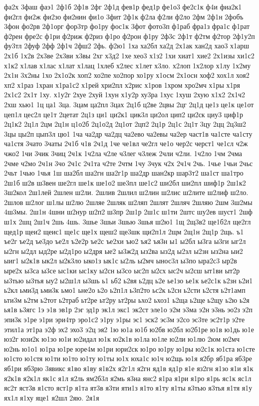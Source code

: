 фа2х
3фаш
фаэ1
2ф1б
2ф1в
2фг
2ф1д
фев1р
фед1р
фе1о3
фе2с1к
ф4и
фиа2к1
фи2гл
фи2ж
фи2зо
фи2нин
фи1о
3фит
2ф1к
ф2ла
ф2ли
ф2ло
2фм
2ф1н
2фобъ
3фон
фо2рв
2ф1орг
фор3тр
фо1ру
фос1к
3фот
фото3п
ф1раб
фра1з
фра1с
ф1рат
ф2рен
фре2с
ф1ри
ф2риж
ф2риз
ф1ро
ф2рон
ф1ру
2ф3с
2ф1т
ф2тм
ф2тор
2ф1у2п
фу3тл
2фуф
2фф
2ф1ч
2фш2
2фь.
ф2ю1
1ха
ха2бл
ха2д
2х1ак
хан2д
хао3
х1арш
2х1б
1х2в
2х3ве
2х3ви
х3вы
2хг
х3д2
1хе
хео3
х1з2
1хи
хиат1
хие2
2х1изы
хи1с2
х1к2
х1лав
х1лас
х1лат
х1лац
1хлеб
х2лес
х1лет
х3ло.
х2лоп
1х2лор
х1лу
1х2му
2х1н
3х2ны
1хо
2х1о2к
хоп2
хо2пе
хо2пор
хо1ру
х1осм
2х1осн
хоф2
хох1л
хоя2
хп2
х1раз
1хран
х1ра1с2
х1рей
хри2пл
х2рис
х1ров
1хром
хро2мч
х1ры
х1ря
2х1с2
2х1т
1ху.
х1у2г
2хуе
2хуй
1хун
х1у2р
ху3ра
1хус
1хуш
2хую
х1х2
2х1ч2
2хш
хью1
1ц
ца1
3ца.
3цам
ца2пл
3цах
2ц1б
ц2ве
2цвы
2цг
2ц1д
це1з
це1к
це1от
цеп1л
цес2л
це1т
2цетат
2ц1з
ци1
ци2к1
цик3л
ци2ол
цип2
ци2ск
циу3
циф1р
2ц1к2
2ц1л
2цм
2ц1н
ц1о2б
2ц1о2д
2ц1от
2цп2
2ц1р
2ц1с
2ц1т
3цу
2цц
2ц3ш2
3цы
цы2п
цып3л
цю1
1ча
ча2др
ча2дц
ча2ево
ча2евы
ча2ер
част1в
ча1сте
ча1сту
ча1стя
3чато
3чаты
2ч1б
ч1в
2ч1д
1че
че1вл
че2гл
че1о
чер2с
черст1
че1сл
ч2ж
чжо2
1чи
3чик
3чиц
2ч1к
1ч2ла
ч2ле
ч3лег
ч3леж
2чли
ч2ли.
1ч2ло
1чм
2чма
2чме
ч2мо
2ч1н
3чо
2ч1с
2ч1та
ч2те
2чтм
1чу
3чук
ч2х
2ч1ч
2чь.
1чье
1чьи
2чьс
2чьт
1чью
1чья
1ш
ша2бл
ша2гн
ша2г1р
ша2др
шан2кр
шар3т2
ша1ст
ша1тро
2ш1б
ш2в
ш3вен
ше2гл
ше1к
ше1о2
ше3пл
ше1с2
ши2бл
ши2пл
шиф1р
2ш1к2
3ш2кол
2ш1лей
2шлен
ш2ли.
2шлив
2шлил
ш2лин
ш2лис
ш2лите
ш2лиф
ш2ло.
2шлов
ш2лог
ш1лы
ш2лю
2шляе
2шляк
ш2ляп
2шлят
2шляч
2шляю
2шм
3ш2мы
4ш3мы.
2ш1н
4шни
ш2нур
ш2п2
ш3пр
2ш1р
2ш1с
ш1ти
2штс
шу2ев
шуст1
2шф
ш1х
2шц
2ш1ч
2шь
4шь.
3шье
3шьи
3шью
3шья
ш2ю1
1щ
2щ3в2
ще1б2л
ще2гл
щед1р
щеи2
щеис1
ще1с
ще1х
щеш2
ще3шк
щи2п1л
2щм
2щ1н
2щ1р
2щь.
ъ1
ъе2г
ъе2д
ъе3до
ъе2л
ъ2е2р
ъе2с
ъе2хи
ъю2
ъя2
ъя3н
ы1
ы2бл
ы3га
ы3ги
ыг2л
ы2гн
ы2дл
ыд2ре
ы2д1ро
ы2дря
ые2
ы3ж2д
ыз2ва
ыз2д
ы2зл
ы2зн
ыз2на
ыи2
ыиг1
ы2к1в
ык2л
ы2к3ло
ыко1з
ык1с
ы2ль
ы2мч
ынос3л
ы3по
ыра2с3
ыр2в
ыре2х
ы3са
ы3се
ыс1ки
ыс1ку
ы2сн
ы3со
ыс2п
ы2сх
ыс2ч
ы2сш
ыт1ви
ыт2р
ы3тью
ы3тья
ыу2
ы2ш1л
ы3шь
ь1
ьб2
ь2вя
ь2дц
ь2е
ье1зо
ье1к
ье2с1к
ь2зн
ь2и1
ь2кл
ьми3д
ьми3к
ьмо1
ьне2о
ь2о
ь2п1л
ь3п2то
ьс2к
ь2сн
ь2сти
ь2стя
ь2т1амп
ьти3м
ь2тм
ь2тот
ь2траб
ьт2ре
ьт2ру
ьт2ры
ьхо2
ьхоз1
ь2ща
ь2ще
ь2щу
ь2ю
ь2я
ья1в
ь3ягс
1э
э1в
эв1р
2эг
эд1р
эк1л
экс1
эк2ст
эле1о
э2м
э3ма
э2н
э3нь
эо2з
э2п
эпи3к
э1ре
э1ри
эри4тр
эро1с2
э1ру
э1ры
эс1
эск2
эс3м
э2со
эс3те
эс2т1р
э2те
этил1а
эт1ра
э2ф
эх2
эхо3
э2ц
эя2
1ю
ю1а
ю1б
ю2бв
ю2бл
ю2б1ре
ю1в
ю1дь
ю1е
юз2г
юзи2к
ю1зо
ю1и
ю2идал
ю1к
ю2к1в
ю1ла
ю1ле
ю2ли
ю1лю
2юм
ю2мч
ю2нь
ю1о1
ю1ра
ю1ре
юре4м
ю1ри
юри2ск
ю1ро
ю1ру
ю1ры
ю2с1к
ю1ста
ю1сте
ю1сто
ю1стя
ю1ти
ю1то
ю1ту
ю1ты
ю1х
юха1с
ю1ч
ю2щь
ю1я
я2бр
яб1ра
яб3ре
яб1ри
яб3рю
3явикс
я1во
я1ву
я1в2х
я2г1л
я2гн
яд1в
яд1р
я1е
яз2гн
я1зо
я1и
я1к
я2к1в
я2к1л
як1с
я1л
я2ль
ям2б3л
я2мь
я3на
янс2
я1ра
я1ри
я1ро
я1рь
яс1к
яс1л
яс2т
яст3в
я1сто
яст1р
я1та
ят3в
я3ти
яти1з
я1то
я1ту
я1ты
я3тью
я3тья
я1тя
я1у
ях1л
я1ху
яце1
я2шл
2яю.
2я1я

